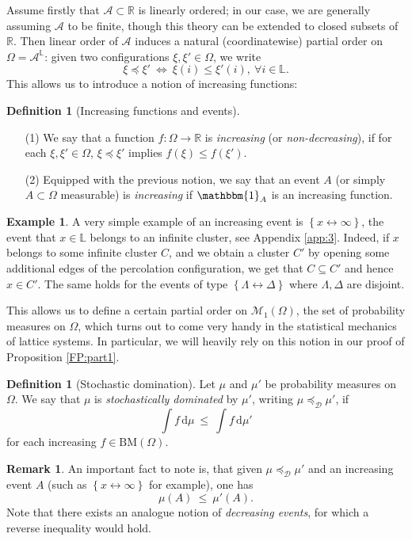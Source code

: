 \documentclass[12pt]{article}
\newcommand{\A}{\mathcal{A}}
\newcommand{\D}{\mathcal{D}}
\renewcommand{\d}{\mathrm{d}}
\renewcommand{\L}{\mathbb{L}}
\newcommand{\M}{\mathcal{M}}
\newcommand{\R}{\mathbb{R}}
\newcommand{\BM}{\mathrm{BM}}
\newcommand{\set}[1]{\left\{#1\right\}}
\newcommand{\ra}{\rightarrow}
\newcommand{\1}{\mathbbm{1}}
\newcommand{\5}{\vspace{0.5cm}}
\theoremstyle{definition}
\newtheorem{ex}[thm]{Example}
\newtheorem{df}[thm]{Definition}
\newtheorem{rem}[thm]{Remark}
\begin{document}
Assume firstly that $\A\subset\R$ is linearly ordered; in our case, we are generally assuming $\A$ to be finite, though this theory can be extended to closed subsets of $\R$. Then linear order of $\A$ induces a natural (coordinatewise) partial order on $\Omega=\A^\L$: given two configurations $\xi,\xi'\in\Omega$, we write
$$\xi\preceq\xi' ~\iff~ \xi(i)\leq\xi'(i),~\forall i\in\L.$$
This allows us to introduce a notion of increasing functions:

\begin{df}[Increasing functions and events]
~
\begin{itemize}
	\item[(1)] We say that a function $f:\Omega\ra\R$ is \textit{increasing} (or \textit{non-decreasing}), if for each $\xi,\xi'\in\Omega$, $\xi\preceq\xi'$ implies $f(\xi)\leq f(\xi')$. 
	\item[(2)] Equipped with the previous notion, we say that an event $A$ (or simply $A\subset\Omega$ measurable) is \textit{increasing} if $\1_A$ is an increasing function.
\end{itemize}
\end{df}

\begin{ex}
A very simple example of an increasing event is $\set{x\leftrightarrow\infty}$, the event that $x\in\L$ belongs to an infinite cluster, see Appendix \ref{app:3}. Indeed, if $x$ belongs to some infinite cluster $C$, and we obtain a cluster $C'$ by opening some additional edges of the percolation configuration, we get that $C\subseteq C'$ and hence $x\in C'$. The same holds for the events of type $\set{\Lambda\leftrightarrow\Delta}$ where $\Lambda,\Delta$ are disjoint.
\end{ex}

 This allows us to define a certain partial order on $\M_1(\Omega)$, the set of probability measures on $\Omega$, which turns out to come very handy in the statistical mechanics of lattice systems. In particular, we will heavily rely on this notion in our proof of Proposition \ref{FP:part1}.
 
\begin{df}[Stochastic domination]
Let $\mu$ and $\mu'$ be probability measures on $\Omega$. We say that $\mu$ is \textit{stochastically dominated} by $\mu'$, writing $\mu\preceq_\D\mu'$, if
$$\int f\,\d\mu ~\leq~ \int f\,\d\mu'$$
for each increasing $f\in\BM(\Omega)$.
\end{df}

\begin{rem}
An important fact to note is, that given $\mu\preceq_\D\mu'$ and an increasing event $A$ (such as $\set{x\leftrightarrow\infty}$ for example), one has 
$$\mu(A) ~\leq~ \mu'(A).$$
Note that there exists an analogue notion of \textit{decreasing events}, for which a reverse inequality would hold.
\end{rem}
\end{document}

